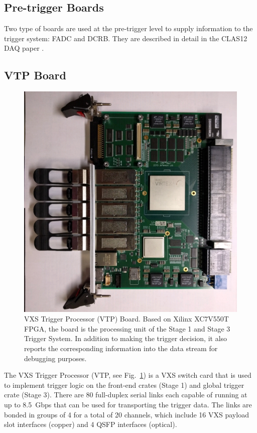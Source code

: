 \subsection{Pre-trigger Boards}

Two type of boards are used at the pre-trigger level to supply information to the trigger system: FADC and DCRB. They are described in detail in the CLAS12 DAQ paper \cite{daq-ref}.

\subsection{VTP Board}
\label{sec:vtp_board}

\begin{figure}[hbt]
	\centering
	\includegraphics[width=1.0\columnwidth,keepaspectratio]{img/vtp_board.png}
	\caption{VXS Trigger Processor (VTP) Board. Based on Xilinx XC7V550T FPGA, the board is the processing unit of the Stage 1 and Stage 3 Trigger System. In addition to making the trigger decision, it also reports the corresponding information into the data stream for debugging purposes.}
	\label{fig:vtp_board}
\end{figure}

The VXS Trigger Processor (VTP, see Fig.~\ref{fig:vtp_board}) is a VXS switch card that is used to implement trigger logic on the front-end crates (Stage 1) and global trigger crate (Stage 3). There are 80 full-duplex serial links each capable of running at up to 8.5~Gbps that can be used for transporting the trigger data. The links are bonded in groups of 4 for a total of 20 channels, which include 16 VXS payload slot interfaces (copper) and 4 QSFP interfaces (optical).

